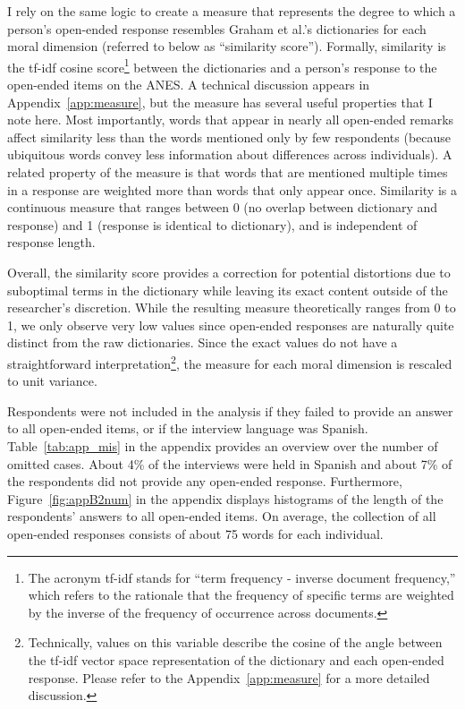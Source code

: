 \documentclass[12pt]{article}
\begin{document}
I rely on the same logic to create a measure that represents the degree to which a person's open-ended response resembles Graham et al.'s \citeyearpar{graham2009liberals} dictionaries for each moral dimension (referred to below as ``similarity score''). Formally, similarity is the tf-idf cosine score\footnote{The acronym tf-idf stands for ``term frequency - inverse document frequency,'' which refers to the rationale that the frequency of specific terms are weighted by the inverse of the frequency of occurrence across documents.} between the dictionaries and a person's response to the open-ended items on the ANES. A technical discussion appears in Appendix~\ref{app:measure}, but the measure has several useful properties that I note here. Most importantly, words that appear in nearly all open-ended remarks affect similarity less than the words mentioned only by few respondents (because ubiquitous words convey less information about differences across individuals). A related property of the measure is that words that are mentioned multiple times in a response are weighted more than words that only appear once. Similarity is a continuous measure that ranges between 0 (no overlap between dictionary and response) and 1 (response is identical to dictionary), and is independent of response length.

Overall, the similarity score provides a correction for potential distortions due to suboptimal terms in the dictionary while leaving its exact content outside of the researcher's discretion. While the resulting measure theoretically ranges from 0 to 1, we only observe very low values since open-ended responses are naturally quite distinct from the raw dictionaries. Since the exact values do not have a straightforward interpretation\footnote{Technically, values on this variable describe the cosine of the angle between the tf-idf vector space representation of the dictionary and each open-ended response. Please refer to the Appendix~\ref{app:measure} for a more detailed discussion.}, the measure for each moral dimension is rescaled to unit variance.

Respondents were not included in the analysis if they failed to provide an answer to all open-ended items, or if the interview language was Spanish. Table~\ref{tab:app_mis} in the appendix provides an overview over the number of omitted cases. About 4\% of the interviews were held in Spanish and about 7\% of the respondents did not provide any open-ended response. Furthermore, Figure~\ref{fig:appB2num} in the appendix displays histograms of the length of the respondents' answers to all open-ended items. On average, the collection of all open-ended responses consists of about 75 words for each individual.
\end{document}
